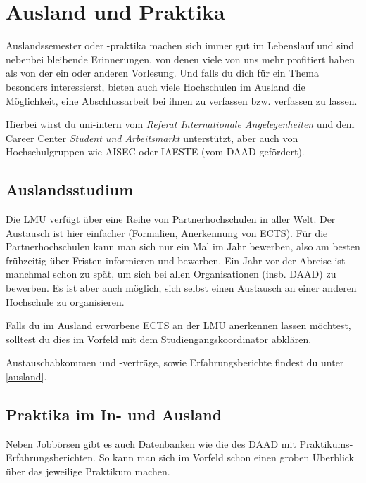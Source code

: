 ﻿\chapter{Ausland und Praktika}

Auslandssemester oder -praktika machen sich immer gut im Lebenslauf
und sind nebenbei bleibende Erinnerungen, von denen viele von uns mehr
profitiert haben als von der ein oder anderen Vorlesung. Und falls du
dich für ein Thema besonders interessierst, bieten auch viele
Hochschulen im Ausland die Möglichkeit, eine Abschlussarbeit bei ihnen
zu verfassen bzw. verfassen zu lassen.

Hierbei wirst du uni-intern vom \emph{Referat Internationale Angelegenheiten} und dem Career Center \emph{Student und Arbeitsmarkt} unterstützt, aber auch von Hochschulgruppen wie AISEC oder IAESTE (vom DAAD gefördert).

\section{Auslandsstudium}

Die LMU verfügt über eine Reihe von Partnerhochschulen in aller
Welt. Der Austausch ist hier einfacher (Formalien, Anerkennung von
ECTS). Für die
Partnerhochschulen kann man sich nur ein Mal im Jahr bewerben, also am
besten frühzeitig über Fristen informieren und bewerben.
Ein Jahr vor der Abreise ist manchmal schon zu spät, um sich bei
allen Organisationen (insb. DAAD) zu bewerben.
Es ist aber auch möglich, sich selbst einen Austausch an einer anderen
Hochschule zu organisieren.

Falls du im Ausland erworbene ECTS an der LMU anerkennen lassen
möchtest, solltest du dies im Vorfeld mit dem Studiengangskoordinator
abklären.

Austauschabkommen und -verträge, sowie Erfahrungsberichte findest du unter \ref{ausland}.

\begin{urlList}
\end{urlList}

\section{Praktika im In- und Ausland}

Neben Jobbörsen gibt es auch Datenbanken wie die des DAAD mit
Praktikums-Erfahrungsberichten. So kann man sich im Vorfeld schon
einen groben Überblick über das jeweilige Praktikum machen.

